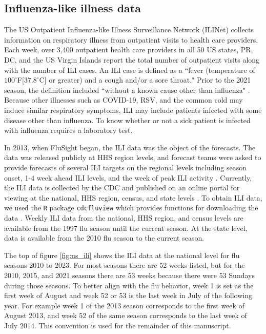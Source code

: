 \subsection{Influenza-like illness data}
The US Outpatient Influenza-like Illness Surveillance Network (ILINet) collects 
information on respiratory illness from outpatient visits to health care 
providers. Each week, over 3,400 outpatient health care providers in all 50 
US states, PR, 
DC, and the US Virgin Islands report the total number of outpatient 
visits along with the number of ILI cases. An ILI case is defined as a 
``fever (temperature of $100^{\circ}$F[$37.8^{\circ}$C] or greater) and a cough 
and/or a sore throat." Prior to the 2021 season, the definition included 
``without a known cause other than influenza" \cite[]{cdcfluview2023}. Because 
other illnesses such as COVID-19, RSV, and the common cold may induce similar 
respiratory symptoms, ILI may include patients infected with some disease 
other than influenza. To know whether or not a sick patient is infected with 
influenza requires a laboratory test. 

In 2013, when FluSight began, the ILI data was the object of the forecasts. 
The data was released publicly at HHS region levels, and forecast teams were 
asked to provide forecasts of several ILI targets on the regional levels 
including season onset, 1-4 week ahead ILI levels, and the week of peak ILI 
activity \cite[]{biggerstaff2016results,mcgowan2019collaborative}. Currently, 
the ILI data is collected by the CDC and published on an online portal for 
viewing at the national, HHS region, census, and state levels 
\cite[]{cdc2024fluviewportal}. To obtain ILI data, we used the \texttt{R} 
package \texttt{cdcfluview} which provides functions for downloading the data 
\cite[]{rudis2021cdcfluview}. Weekly ILI data from the national, HHS region, 
and census levels are available from the 1997 flu season until the current 
season. At the state level, data is available from the 2010 flu season to the 
current season. 

The top of figure \ref{fig:us_ili} shows the ILI data at the national level for 
flu seasons 2010 to 2023. For most seasons there are 52 weeks listed, but for 
the 2010, 2015, and 2021 seasons there are 53 weeks because there were 53 
Sundays during those seasons. 
To better align with the flu behavior, week 1 is set as the first week of 
August and week 52 or 53 is the last week in July of the following year. For 
example week 1 of the 2013 season corresponds to the first week of August 2013, 
and week 52 of the same season corresponds to the last week of July 2014. This 
convention is used for the remainder of this manuscript. 

